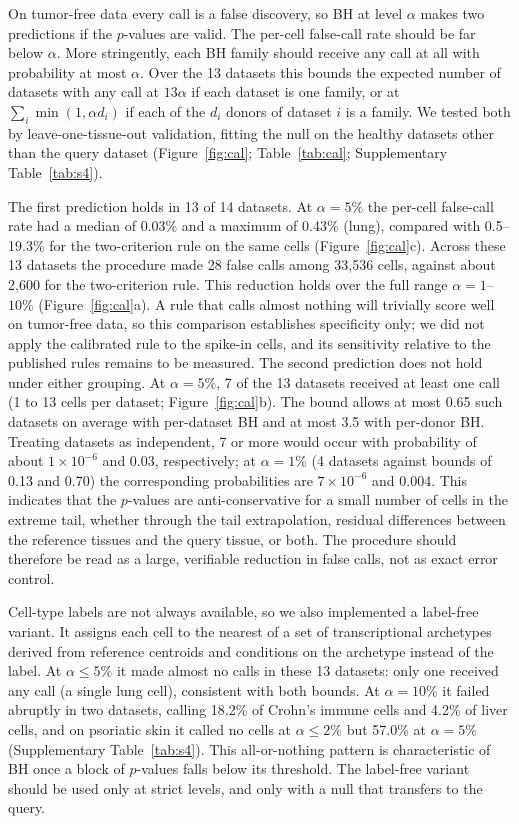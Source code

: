 \documentclass[11pt,letterpaper]{article}
\begin{document}
On tumor-free data every call is a false discovery, so BH at level $\alpha$ makes two predictions if the $p$-values are valid. The per-cell false-call rate should be far below $\alpha$. More stringently, each BH family should receive any call at all with probability at most $\alpha$. Over the 13 datasets this bounds the expected number of datasets with any call at $13\alpha$ if each dataset is one family, or at $\sum_i \min(1, \alpha d_i)$ if each of the $d_i$ donors of dataset $i$ is a family. We tested both by leave-one-tissue-out validation, fitting the null on the healthy datasets other than the query dataset (Figure~\ref{fig:cal}; Table~\ref{tab:cal}; Supplementary Table~\ref{tab:s4}).

The first prediction holds in 13 of 14 datasets. At $\alpha = 5\%$ the per-cell false-call rate had a median of 0.03\% and a maximum of 0.43\% (lung), compared with 0.5--19.3\% for the two-criterion rule on the same cells (Figure~\ref{fig:cal}c). Across these 13 datasets the procedure made 28 false calls among 33{,}536 cells, against about 2{,}600 for the two-criterion rule. This reduction holds over the full range $\alpha = 1$--$10\%$ (Figure~\ref{fig:cal}a). A rule that calls almost nothing will trivially score well on tumor-free data, so this comparison establishes specificity only; we did not apply the calibrated rule to the spike-in cells, and its sensitivity relative to the published rules remains to be measured. The second prediction does not hold under either grouping. At $\alpha = 5\%$, 7 of the 13 datasets received at least one call (1 to 13 cells per dataset; Figure~\ref{fig:cal}b). The bound allows at most 0.65 such datasets on average with per-dataset BH and at most 3.5 with per-donor BH. Treating datasets as independent, 7 or more would occur with probability of about $1\times10^{-6}$ and 0.03, respectively; at $\alpha = 1\%$ (4 datasets against bounds of 0.13 and 0.70) the corresponding probabilities are $7\times10^{-6}$ and 0.004. This indicates that the $p$-values are anti-conservative for a small number of cells in the extreme tail, whether through the tail extrapolation, residual differences between the reference tissues and the query tissue, or both. The procedure should therefore be read as a large, verifiable reduction in false calls, not as exact error control.

Cell-type labels are not always available, so we also implemented a label-free variant. It assigns each cell to the nearest of a set of transcriptional archetypes derived from reference centroids and conditions on the archetype instead of the label. At $\alpha \le 5\%$ it made almost no calls in these 13 datasets: only one received any call (a single lung cell), consistent with both bounds. At $\alpha = 10\%$ it failed abruptly in two datasets, calling 18.2\% of Crohn's immune cells and 4.2\% of liver cells, and on psoriatic skin it called no cells at $\alpha \le 2\%$ but 57.0\% at $\alpha = 5\%$ (Supplementary Table~\ref{tab:s4}). This all-or-nothing pattern is characteristic of BH once a block of $p$-values falls below its threshold. The label-free variant should be used only at strict levels, and only with a null that transfers to the query.
\end{document}
